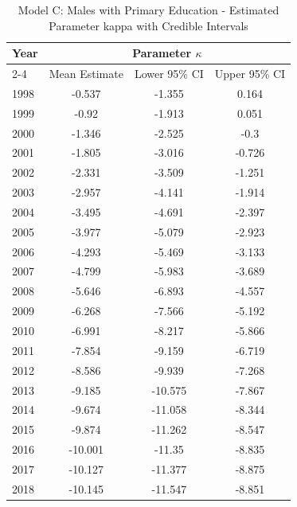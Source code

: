 \begin{landscape}
\begin{table}[htbp]
\centering
\caption{Model C: Males with Primary Education - Estimated Parameter kappa  with Credible Intervals}
\label{tab:parameters_k22}
\begin{tabular}{@{}lccc@{}}
\toprule
Year & \multicolumn{3}{c}{Parameter \(\kappa\)} \\
\cmidrule(lr){2-4}
      & Mean Estimate & Lower 95\% CI & Upper 95\% CI \\
\midrule
1998 & -0.537 & -1.355 & 0.164 \\
1999 & -0.92 & -1.913 & 0.051 \\
2000 & -1.346 & -2.525 & -0.3 \\
2001 & -1.805 & -3.016 & -0.726 \\
2002 & -2.331 & -3.509 & -1.251 \\
2003 & -2.957 & -4.141 & -1.914 \\
2004 & -3.495 & -4.691 & -2.397 \\
2005 & -3.977 & -5.079 & -2.923 \\
2006 & -4.293 & -5.469 & -3.133 \\
2007 & -4.799 & -5.983 & -3.689 \\
2008 & -5.646 & -6.893 & -4.557 \\
2009 & -6.268 & -7.566 & -5.192 \\
2010 & -6.991 & -8.217 & -5.866 \\
2011 & -7.854 & -9.159 & -6.719 \\
2012 & -8.586 & -9.939 & -7.268 \\
2013 & -9.185 & -10.575 & -7.867 \\
2014 & -9.674 & -11.058 & -8.344 \\
2015 & -9.874 & -11.262 & -8.547 \\
2016 & -10.001 & -11.35 & -8.835 \\
2017 & -10.127 & -11.377 & -8.875 \\
2018 & -10.145 & -11.547 & -8.851 \\
\bottomrule
\end{tabular}
\end{table}
\end{landscape}